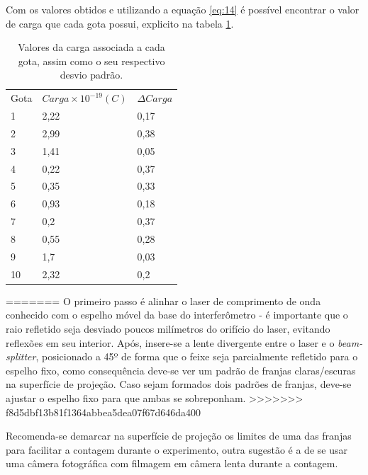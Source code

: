 Com os valores obtidos e  utilizando a equação \ref{eq:14} é possível encontrar o valor de carga que cada gota possui, explicito na tabela \ref{tab:Car}.
\begin{table}[!htb]
\centering
\begin{tabular}{l|ll|}
Gota & $Carga \times 10^{-19} (C)$ & $\Delta Carga$ \\
\rowcolor[HTML]{C0C0C0}
1    & 2,22                        & 0,17           \\ 
2    & 2,99                        & 0,38           \\
\rowcolor[HTML]{C0C0C0} 
3    & 1,41                        & 0,05           \\
4    & 0,22                        & 0,37           \\
\rowcolor[HTML]{C0C0C0} 
5    & 0,35                        & 0,33           \\
6    & 0,93                        & 0,18           \\
\rowcolor[HTML]{C0C0C0} 
7    & 0,2                         & 0,37           \\
8    & 0,55                        & 0,28           \\
\rowcolor[HTML]{C0C0C0} 
9   & 1,7                         & 0,03           \\
10   & 2,32                        & 0,2            \\ \hline
\end{tabular}
\caption{Valores da carga associada a cada gota, assim como o seu respectivo desvio padrão.}
\label{tab:Car}
\end{table}

=======
    O primeiro passo é alinhar o laser de comprimento de onda conhecido com o espelho móvel da base do interferômetro - é importante que o raio refletido seja desviado poucos milímetros do orifício do laser, evitando reflexões em seu interior. Após, insere-se a lente divergente entre o laser e o {\it beam-splitter}, posicionado a 45º de forma que o feixe seja parcialmente refletido para o espelho fixo, como consequência deve-se ver um padrão de franjas claras/escuras na superfície de projeção. Caso sejam formados dois padrões de franjas, deve-se ajustar o espelho fixo para que ambas se sobreponham. 
>>>>>>> f8d5dbf13b81f1364abbea5dea07f67d646da400

    Recomenda-se demarcar na superfície de projeção os limites de uma das franjas para facilitar a contagem durante o experimento, outra sugestão é a de se usar uma câmera fotográfica com filmagem em câmera lenta durante a contagem. 
    
